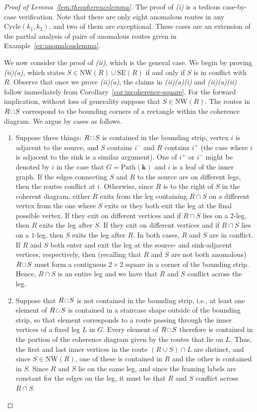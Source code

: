\documentclass[10pt,a4paper]{amsart}
\newcommand\Cycle{\mathrm{Cycle}}
\newcommand\NW{\mathrm{NW}}
\newcommand\Path{\mathrm{Path}}
\newcommand\SE{\mathrm{SE}}
\newcommand\bk{\mathbf{k}}
\newcommand\squarette{\scalebox{0.75}{\hbox{$\,\square\,$}}}
\begin{document}
\begin{proof}[Proof of Lemma~\ref{lem:thecoherencelemma}]

The proof of \textit{(i)} is a tedious case-by-case verification.
Note that there are only eight anomalous routes in any $\Cycle(k_1,k_2)$, and two of them are exceptional.
These cases are an extension of the partial analysis of pairs of anomalous routes given in Example~\ref{ex:anomalouslemma}.

We now consider the proof of \textit{(ii)}, which is the general case.
We begin by proving \textit{(ii)(a)}, which states $S\in \NW(R) \cup \SE(R)$ if and only if $S$ is in conflict with $R$.
Observe that once we prove \textit{(ii)(a)}, the claims in \textit{(ii)(a)(i)} and \textit{(ii)(a)(ii)} follow immediately from Corollary~\ref{cor:incoherence-square}.
For the forward implication, without loss of generality suppose that $S\in \NW(R)$.
The routes in $R\squarette  S$ correspond to the bounding corners of a rectangle within the coherence diagram.
We argue by cases as follows.
\begin{enumerate}
    \item Suppose three things: $R\squarette S$ is contained in the bounding strip, vertex $i$ is adjacent to the source, and $S$ contains $i^-$ and $R$ contains $i^+$ (the case where $i$ is adjacent to the sink is a similar argument).
    One of $i^+$ or $i^-$ might be denoted by $i$ in the case that $G=\Path(\bk)$ and $i$ is a leaf of the inner graph. 
    If the edges connecting $S$ and $R$ to the source are on different legs, then the routes conflict at $i$.
    Otherwise, since $R$ is to the right of $S$ in the coherent diagram, either $R$ exits from the leg containing $R\cap S$ on a different vertex from the one where $S$ exits or they both exit the leg at the final possible vertex.
    If they exit on different vertices and if $R\cap S$ lies on a $2$-leg, then $R$ exits the leg after $S$.
    If they exit on different vertices and if $R\cap S$ lies on a $1$-leg, then $S$ exits the leg after $R$.
    In both cases, $R$ and $S$ are in conflict.
    If $R$ and $S$ both enter and exit the leg at the source- and sink-adjacent vertices, respectively, then (recalling that $R$ and $S$ are not both anomalous) $R\squarette S$ must form a contiguous $2\times 2$ square in a corner of the bounding strip.
    Hence, $R\cap S$ is an entire leg and we have that $R$ and $S$ conflict across the leg.
    \item Suppose that $R\squarette S$ is not contained in the bounding strip, i.e., at least one element of $R\squarette S$ is contained in a staircase shape outside of the bounding strip, so that element corresponds to a route passing through the inner vertices of a fixed leg $L$ in $G$.
    Every element of $R\squarette S$ therefore is contained in the portion of the coherence diagram given by the routes that lie on $L$.
    Thus, the first and last inner vertices in the route $(R\cup S)\cap L$ are distinct, and since $S\in \NW(R)$, one of these is contained in $R$ and the other is contained in $S$.
    Since $R$ and $S$ lie on the same leg, and since the framing labels are constant for the edges on the leg, it must be that $R$ and $S$ conflict across $R\cap S$.
\end{enumerate}


\end{proof}
\end{document}
